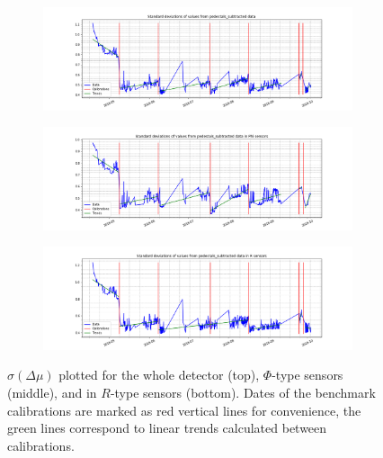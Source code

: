 \begin{figure}
\centering
\begin{subfigure}[b]{1.\textwidth}
    \centering
    \includegraphics[width=\linewidth]{figures/chapter4/wtte/stdevs_trends_calibs.png}
\caption{}
    \label{plot:wtte1-stdevs}
  \end{subfigure}

\begin{subfigure}[b]{1.\textwidth}
    \centering
    \includegraphics[width=\linewidth]{figures/chapter4/wtte/pstdevs_trends_calibs.png}
\caption{}
    \label{plot:wtte1-p-stdevs}
  \end{subfigure}

\begin{subfigure}[b]{1.\textwidth}
    \centering
    \includegraphics[width=\linewidth]{figures/chapter4/wtte/rstdevs_trends_calibs.png}
\caption{}
    \label{plot:wtte1-r-stdevs}
  \end{subfigure}
  \caption[Two numerical solutions]{$\sigma(\Delta\mu)$ plotted for the whole detector (top), $\Phi$-type sensors (middle), and in $R$-type sensors (bottom). Dates of the benchmark calibrations are marked as red vertical lines for convenience, the green lines correspond to linear trends calculated between calibrations.}
\end{figure}

